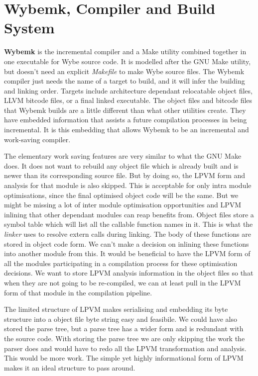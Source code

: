 \chapter{Wybemk, Compiler and Build System}

\textbf{Wybemk} is the incremental compiler and a Make utility combined
together in one executable for Wybe source code. It is modelled after the GNU
Make utility, but doesn't need an explicit \textit{Makefile} to make Wybe
source files. The Wybemk compiler just needs the name of a target to build, and
it will infer the building and linking order. Targets include architecture
dependant relocatable object files, LLVM bitcode files, or a final linked
executable. The object files and bitcode files that Wybemk builds are a little
different than what other utilities create. They have embedded information that
assists a future compilation processes in being incremental. It is this
embedding that allows Wybemk to be an incremental and work-saving compiler.

The elementary work saving features are very similar to what the GNU Make does.
It does not want to rebuild any object file which is already built and is newer
than its corresponding source file. But by doing so, the LPVM form and analysis
for that module is also skipped. This is acceptable for only intra module
optimisations, since the final optimised object code will be the same. But we
might be missing a lot of inter module optimisation opportunities and LPVM
inlining that other dependant modules can reap benefits from. Object files
store a symbol table which will list all the callable function names in
it. This is what the \textit{linker} uses to resolve extern calls during
linking. The body of these functions are stored in object code form. We can't
make a decision on inlining these functions into another module from this. It
would be beneficial to have the LPVM form of all the modules participating in a
compilation process for these optimisation decisions. We want to store LPVM
analysis information in the object files so that when they are not going to be
re-compiled, we can at least pull in the LPVM form of that module in the
compilation pipeline.

The limited structure of LPVM makes serialising and embedding its byte
structure into a object file byte string easy and feasibile. We could have also
stored the parse tree, but a parse tree has a wider form and is redundant with
the source code. With storing the parse tree we are only skipping the work the
parser does and would have to redo all the LPVM transformation and
analysis. This would be more work. The simple yet highly informational form of
LPVM makes it an ideal structure to pass around.


